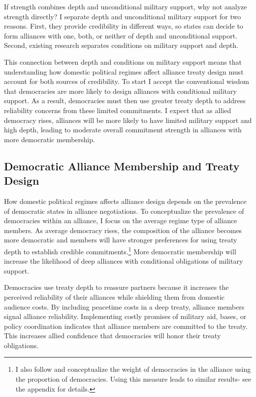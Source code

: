 \documentclass[12pt]{article}
\begin{document}
If strength combines depth and unconditional military support, why not analyze strength directly? 
I separate depth and unconditional military support for two reasons. 
First, they provide credibility in different ways, so states can decide to form alliances with one, both, or neither of depth and unconditional support.  
Second, existing research separates conditions on military support and depth. 


This connection between depth and conditions on military support means that understanding how domestic political regimes affect alliance treaty design must account for both sources of credibility.  
To start I accept the conventional wisdom that democracies are more likely to design alliances with conditional military support. 
As a result, democracies must then use greater treaty depth to address reliability concerns from these limited commitments.
I expect that as allied democracy rises, alliances will be more likely to have limited military support and high depth, leading to moderate overall commitment strength in alliances with more democratic membership. 


\subsection{Democratic Alliance Membership and Treaty Design}


How domestic political regimes affects alliance design depends on the prevalence of democratic states in alliance negotiations. 
To conceptualize the prevalence of democracies within an alliance, I focus on the average regime type of alliance members. 
As average democracy rises, the composition of the alliance becomes more democratic and members will have stronger preferences for using treaty depth to establish credible commitments.\footnote{I also follow \citet{Chibaetal2015} and conceptualize the weight of democracies in the alliance using the proportion of democracies. Using this measure leads to similar results- see the appendix for details.} 
More democratic membership will increase the likelihood of deep alliances with conditional obligations of military support. 


Democracies use treaty depth to reassure partners because it increases the perceived reliability of their alliances while shielding them from domestic audience costs. 
By including peacetime costs in a deep treaty, alliance members signal alliance reliability. 
Implementing costly promises of military aid, bases, or policy coordination indicates that alliance members are committed to the treaty. 
This increases allied confidence that democracies will honor their treaty obligations. 
\end{document}
